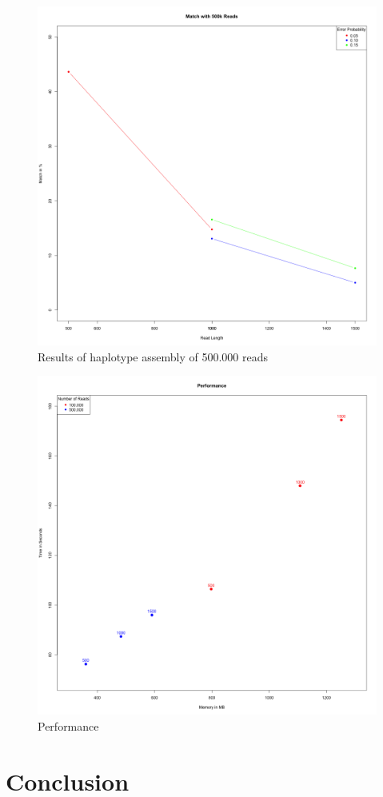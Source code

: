 \documentclass[10pt,a4paper]{article}
\begin{document}
\begin{figure}[h!]
\centering
\includegraphics[width=\textwidth]{../output/plots/plot500k}
\caption{Results of haplotype assembly of 500.000 reads}
\end{figure}

\begin{figure}[h!]
\centering
\includegraphics[width=\textwidth]{../output/plots/plotPerformance}
\caption{Performance}
\end{figure}

\section{Conclusion}
{}

\end{document}
